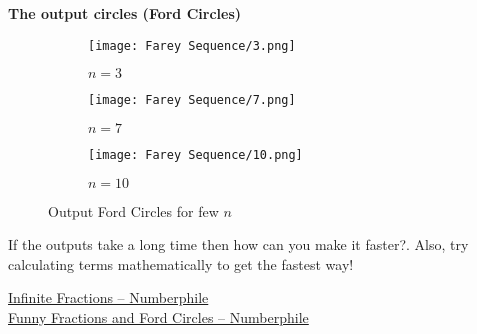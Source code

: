 \textbf{The output circles (Ford Circles)}
\begin{figure}[H]
	\centering
	\begin{subfigure}{0.3\linewidth}
		\texttt{[image: Farey Sequence/3.png]}
		\caption{$n=3$}
	\end{subfigure}
	\begin{subfigure}{0.3\linewidth}
		\texttt{[image: Farey Sequence/7.png]}
		\caption{$n=7$}
	\end{subfigure}
	\begin{subfigure}{0.3\linewidth}
		\texttt{[image: Farey Sequence/10.png]}
		\caption{$n=10$}
	\end{subfigure}
	\caption{Output Ford Circles for few $n$}
\end{figure}
\begin{noteI}
	If the outputs take a long time then how can you make it faster?. Also, try calculating terms mathematically to get the fastest way!
\end{noteI}
\begin{funvideo}
\href{https://youtu.be/DpwUVExX27E}{Infinite Fractions -- Numberphile}\\
\href{https://youtu.be/0hlvhQZIOQw}{Funny Fractions and Ford Circles -- Numberphile}
\end{funvideo}
\recalctypearea